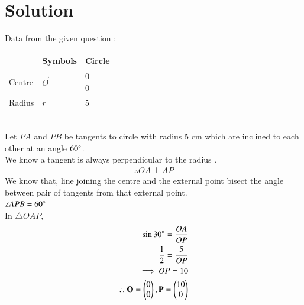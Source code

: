 \documentclass[journal,12pt,twocolumn]{IEEEtran}
\begin{document}
\section{Solution}
Data from the given question :
\begin{table}[!ht]
\begin{center}
\begin{tabular}{ | m{2cm} | m{1.5cm}| m{2cm} | m{1.5cm} |} 
\hline
& Symbols & Circle \\
\hline
Centre & $\vec{O}$ & \myvec{0\\0} \\ 
\hline
Radius & $r$ & 5\\ 
\hline
\end{tabular}
\end{center}
\end{table}
\\
Let $PA$ and $PB$  be tangents  to circle with radius 5 cm  which are inclined to each other at an angle $60\degree$.
\\
We know a tangent is always perpendicular to the radius .
\begin{align}
\therefore OA \perp AP
\end{align}
We know that, line joining the centre and the external point bisect the angle between pair of tangents from that external point.
\\
$\angle APB=60\degree$
\\
 In $\triangle OAP$, 
\begin{align}
\sin30\degree=\frac{OA}{OP}
\\
\frac{1}{2}=\frac{5}{OP}
\\
\implies OP=10
\\
\therefore \mathbf{O}=\begin{pmatrix}0\\0\end{pmatrix} , \mathbf{P}=\begin{pmatrix}10\\0\end{pmatrix}
\end{align}
\end{document}
